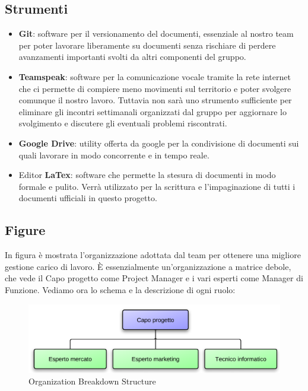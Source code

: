 \subsection{Strumenti}
\begin{itemize}
\item \textbf{Git}: software per il versionamento del documenti, essenziale al nostro team per poter lavorare liberamente su documenti senza rischiare di perdere avanzamenti importanti svolti da altri componenti del gruppo.
\item \textbf{Teamspeak}: software per la comunicazione vocale tramite la rete internet che ci permette di compiere meno movimenti sul territorio e poter svolgere comunque il nostro lavoro. Tuttavia non sarà uno strumento sufficiente per eliminare gli incontri settimanali organizzati dal gruppo per aggiornare lo svolgimento e discutere gli eventuali problemi riscontrati.
\item \textbf{Google Drive}: utility offerta da google per la condivisione di documenti sui quali lavorare in modo concorrente e in tempo reale.
\item Editor \textbf{LaTex}: software che permette la stesura di documenti in modo formale e pulito. Verrà utilizzato per la scrittura e l'impaginazione di tutti i documenti ufficiali in questo progetto.
\end{itemize}

\subsection{Figure}
In figura  è mostrata l'organizzazione adottata dal team per ottenere una migliore gestione carico di lavoro. È essenzialmente un'organizzazione a matrice debole, che vede il Capo progetto come Project Manager e i vari esperti come Manager di Funzione. Vediamo ora lo schema e la descrizione di ogni ruolo:

\vspace*{0.5cm}

\begin{figure}[H]
\centering
\includegraphics[scale=1]{images/cap3/obs.png}
\caption{Organization Breakdown Structure}
\end{figure}

